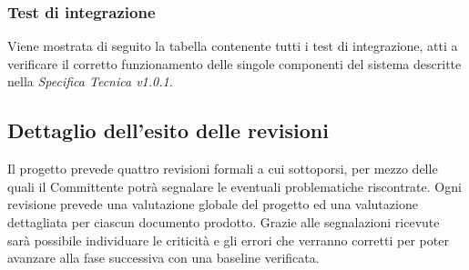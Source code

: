 \documentclass[a4paper]{article}
\begin{document}
	\subsubsection{Test di integrazione}
		Viene mostrata di seguito la tabella contenente tutti i test di integrazione, atti a verificare il corretto funzionamento delle singole componenti del sistema descritte nella \emph{Specifica Tecnica v1.0.1}. 
	
	\subsection{Dettaglio dell'esito delle revisioni}
			Il progetto prevede quattro revisioni formali a cui sottoporsi, per mezzo delle quali il Committente potrà segnalare 
			le eventuali problematiche riscontrate. Ogni revisione prevede una valutazione globale del progetto ed una valutazione 
			dettagliata per ciascun documento prodotto. Grazie alle segnalazioni ricevute sarà possibile individuare le criticità 
			e gli errori che verranno corretti per poter avanzare alla fase successiva con una baseline verificata.
			
\end{document}
